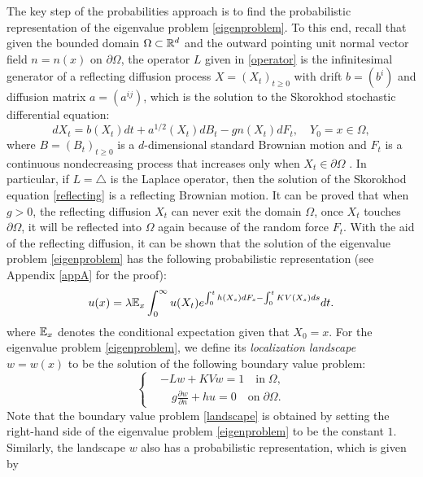 \documentclass[a4paper,11pt]{article}
\begin{document}
The key step of the probabilities approach is to find the probabilistic representation of the eigenvalue problem \eqref{eigenproblem}. To this end, recall that given the bounded domain $\Omega \subset \mathbb{R}^d$ and the outward pointing unit normal vector field $n = n(x)$ on $\partial \Omega$, the operator $L$ given in \eqref{operator} is the infinitesimal generator of a reflecting diffusion process $X = (X_t)_{t \geq 0}$ with drift $b = (b^i)$ and diffusion matrix $a = (a^{ij})$, which is the solution to the Skorokhod stochastic differential equation:
\begin{equation}\label{reflecting}
dX_t = b(X_t) dt + a^{1/2}(X_t) d B_t - g n(X_t) d F_t, \quad Y_0 = x\in\Omega,
\end{equation}
where $B = (B_t)_{t\geq 0}$ is a $d$-dimensional standard Brownian motion and $F_t$ is a continuous nondecreasing process that increases only when $X_t \in \partial \Omega$ \cite{1998Diffusions}. In particular, if $L = \triangle$ is the Laplace operator, then the solution of the Skorokhod equation \eqref{reflecting} is a reflecting Brownian motion. It can be proved that when $g > 0$, the reflecting diffusion $X_t$ can never exit the domain $\Omega$, once $X_t$ touches $\partial \Omega$, it will be reflected into $\Omega$ again because of the random force $F_t$. With the aid of the reflecting diffusion, it can be shown that the solution of the eigenvalue problem \eqref{eigenproblem} has the following probabilistic representation (see Appendix \ref{appA} for the proof):
\begin{equation}\label{probeigen}
u(x) = \lambda \mathbb{E}_x \int_{0}^{\infty} u(X_t) e^{\int_{0}^{t} h(X_s) d F_s - \int_{0}^{t} K V(X_s) ds} dt.
\end{equation}
where $\mathbb{E}_x$ denotes the conditional expectation given that $X_0 = x$. For the eigenvalue problem \eqref{eigenproblem}, we define its \emph{localization landscape} $w = w(x)$ to be the solution of the following boundary value problem:
\begin{equation}\label{landscape}
\left\{
\begin{split}
& - L w + K V w = 1 \quad \textrm{in} \; \Omega, \\
& \quad g \frac{\partial w}{\partial n} + h u = 0 \quad \textrm{on} \; \partial \Omega.
\end{split}
\right.
\end{equation}
Note that the boundary value problem \eqref{landscape} is obtained by setting the right-hand side of the eigenvalue problem \eqref{eigenproblem} to be the constant $1$. Similarly, the landscape $w$ also has a probabilistic representation, which is given by
\end{document}
